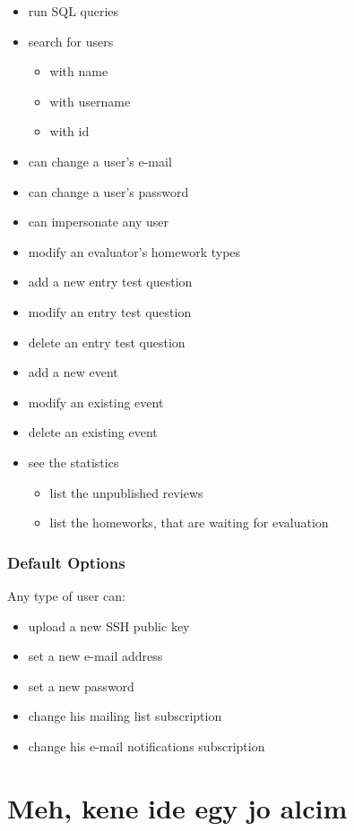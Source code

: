 \begin{itemize}
	\item run SQL queries
	\item search for users
	\begin{itemize}
		\item with name
		\item with username
		\item with id
	\end{itemize}
	\item can change a user's e-mail
	\item can change a user's password
	\item can impersonate any user
	\item modify an evaluator's homework types
	\item add a new entry test question
	\item modify an entry test question
	\item delete an entry test question
	\item add a new event
	\item modify an existing event
	\item delete an existing event
	\item see the statistics
	\begin{itemize}
		\item list the unpublished reviews
		\item list the homeworks, that are waiting for evaluation
	\end{itemize}
\end{itemize}

\subsubsection{Default Options}

Any type of user can:

\begin{itemize}
	\item upload a new SSH public key
	\item set a new e-mail address
	\item set a new password
	\item change his mailing list subscription
	\item change his e-mail notifications subscription
\end{itemize}

\section{Meh, kene ide egy jo alcim}




